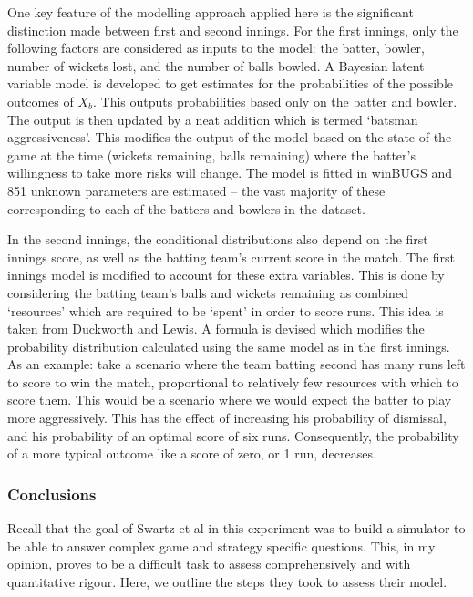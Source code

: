 One key feature of the modelling approach applied here is the significant distinction made between first and second innings. For the first innings, only the following factors are considered as inputs to the model: the batter, bowler, number of wickets lost, and the number of balls bowled. A Bayesian latent variable model is developed to get estimates for the probabilities of the possible outcomes of $X_{b}$. This outputs probabilities based only on the batter and bowler. The output is then updated by a neat addition which is termed ‘batsman aggressiveness’. This modifies the output of the model based on the state of the game at the time (wickets remaining, balls remaining) where the batter’s willingness to take more risks will change. The model is fitted in winBUGS and 851 unknown parameters are estimated – the vast majority of these corresponding to each of the batters and bowlers in the dataset.

In the second innings, the conditional distributions also depend on the first innings score, as well as the batting team’s current score in the match. The first innings model is modified to account for these extra variables. This is done by considering the batting team’s balls and wickets remaining as combined ‘resources’ which are required to be ‘spent’ in order to score runs. This idea is taken from Duckworth and Lewis. \cite{duckworth_fair_1998} \cite{duckworth_successful_2004} A formula is devised which modifies the probability distribution calculated using the same model as in the first innings. As an example: take a scenario where the team batting second has many runs left to score to win the match, proportional to relatively few resources with which to score them. This would be a scenario where we would expect the batter to play more aggressively. This has the effect of increasing his probability of dismissal, and his probability of an optimal score of six runs. Consequently, the probability of a more typical outcome like a score of zero, or 1 run, decreases.

\subsubsection{Conclusions}

Recall that the goal of Swartz et al in this experiment was to build a simulator to be able to answer complex game and strategy specific questions. This, in my opinion, proves to be a difficult task to assess comprehensively and with quantitative rigour. Here, we outline the steps they took to assess their model.

